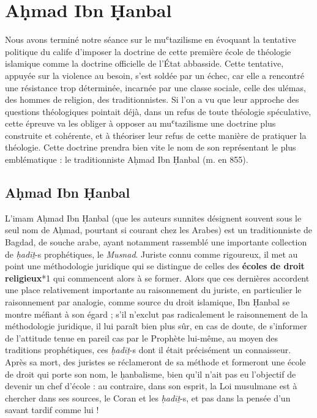 
\hypertarget{suxe9ance-3}{%
\chapter{Aḥmad Ibn Ḥanbal}\label{suxe9ance-3}}



Nous avons terminé notre séance sur le muʿtazilisme en évoquant la
tentative politique du calife d'imposer la doctrine de cette première
école de théologie islamique comme la doctrine officielle de l'État
abbasside. Cette tentative, appuyée sur la violence au besoin, s'est
soldée par un échec, car elle a rencontré une résistance trop
déterminée, incarnée par une classe sociale, celle des ulémas, des
hommes de religion, des traditionnistes. Si l'on a vu que leur approche
des questions théologiques pointait déjà, dans un refus de toute
théologie spéculative, cette épreuve va les obliger à opposer au
muʿtazilisme une doctrine plus construite et cohérente, et à théoriser
leur refus de cette manière de pratiquer la théologie. Cette doctrine
prendra bien vite le nom de son représentant le plus emblématique : le
traditionniste Aḥmad Ibn Ḥanbal (m. en 855).


\hypertarget{aux1e25mad-ibn-ux1e25anbal}{%
\section{Aḥmad Ibn Ḥanbal}\label{aux1e25mad-ibn-ux1e25anbal}}


L'imam Aḥmad Ibn Ḥanbal (que les auteurs sunnites désignent souvent sous
le seul nom de Aḥmad, pourtant si courant chez les Arabes) est un
traditionniste de Bagdad, de souche arabe, ayant notamment rassemblé une
importante collection de \emph{ḥadīṯ}-s prophétiques, le \emph{Musnad}.
Juriste connu comme rigoureux, il met au point une méthodologie
juridique qui se distingue de celles des \textbf{écoles de droit
religieux}*1 qui commencent alors à se former. Alors que ces dernières
accordent une place relativement importante au raisonnement du juriste,
en particulier le raisonnement par analogie, comme source du droit
islamique, Ibn Ḥanbal se montre méfiant à son égard ; s'il n'exclut pas
radicalement le raisonnement de la méthodologie juridique, il lui paraît
bien plus sûr, en cas de doute, de s'informer de l'attitude tenue en
pareil cas par le Prophète lui-même, au moyen des traditions
prophétiques, ces \emph{ḥadīṯ}-s dont il était précisément un
connaisseur. Après sa mort, des juristes se réclameront de sa méthode et
formeront une école de droit qui porte son nom, le ḥanbalisme, bien
qu'il n'ait pas eu l'objectif de devenir un chef d'école : au contraire,
dans son esprit, la Loi musulmane est à chercher dans ses sources, le
Coran et les \emph{ḥadīṯ}-s, et pas dans la pensée d'un savant tardif
comme lui !

